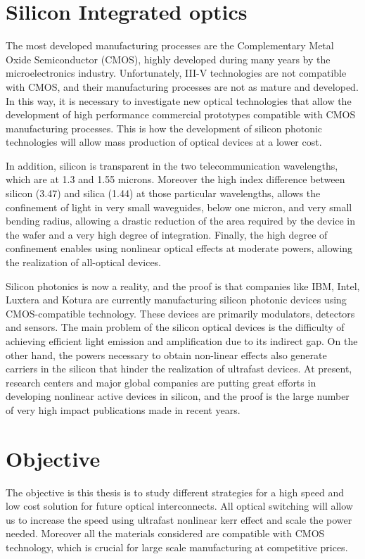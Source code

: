 \section{Silicon Integrated optics}
The most developed manufacturing processes are the Complementary Metal Oxide Semiconductor (CMOS), highly developed during many years by the microelectronics industry.
Unfortunately, III-V technologies are not compatible with CMOS, and their manufacturing processes are not as mature and developed.
In this way, it is necessary to investigate new optical technologies that allow the development of high performance commercial prototypes compatible with CMOS manufacturing processes.
This is how the development of silicon photonic technologies will allow mass production of optical devices at a lower cost.

In addition, silicon is transparent in the two telecommunication wavelengths, which are at 1.3 and 1.55 microns. Moreover the high index difference between silicon (3.47) and silica (1.44) at those particular wavelengths, allows the confinement of light in very small waveguides, below one micron, and very small bending radius, allowing a drastic reduction of the area required by the device in the wafer and a very high degree of integration. Finally, the high degree of confinement enables using nonlinear optical effects at moderate powers, allowing the realization of all-optical devices.

Silicon photonics is now a reality, and the proof is that companies like IBM, Intel, Luxtera and Kotura are currently manufacturing silicon photonic devices using CMOS-compatible technology. These devices are primarily modulators, detectors and sensors.
The main problem of the silicon optical devices is the difficulty of achieving efficient light emission and amplification due to its indirect gap.
On the other hand, the powers necessary to obtain non-linear effects also generate carriers in the silicon that hinder the realization of ultrafast devices.
At present, research centers and major global companies are putting great efforts in developing nonlinear active devices in silicon, and the proof is the large number of very high impact publications made in recent years.~\cite{Reed2004,Almeida2004b,Boyraz2004,Preble2005,Liang:05,Hochberg2006,Jacobsen2006,Foster2007,Waldow2008,Lee2009,koos2009}


\section{Objective}
The objective is this thesis is to study different strategies for a high speed and low cost solution for future optical interconnects. All optical switching will allow us to increase the speed using ultrafast nonlinear kerr effect and scale the power needed. Moreover all the materials considered are compatible with CMOS technology, which is crucial for large scale manufacturing at competitive prices.


